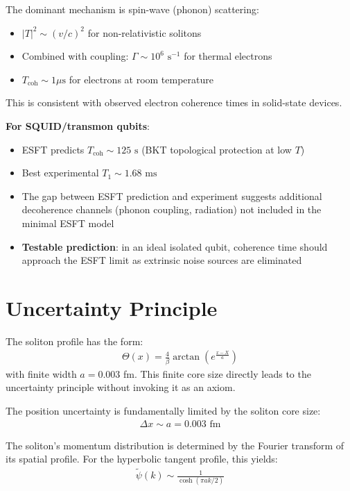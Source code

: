 ﻿\documentclass[twocolumn,showpacs,preprintnumbers,amsmath,amssymb,prd]{revtex4-2}
\begin{document}
The dominant mechanism is spin-wave (phonon) scattering:
\begin{itemize}
\item $|T|^2 \sim (v/c)^2$ for non-relativistic solitons
\item Combined with coupling: $\Gamma \sim 10^6 \text{ s}^{-1}$ for thermal electrons
\item $T_{\text{coh}} \sim 1 \mu\text{s}$ for electrons at room temperature
\end{itemize}

This is consistent with observed electron coherence times in solid-state devices.

\textbf{For SQUID/transmon qubits}:
\begin{itemize}
\item ESFT predicts $T_{\text{coh}} \sim 125 \text{ s}$ (BKT topological protection at low $T$)
\item Best experimental $T_1 \sim 1.68 \text{ ms}$
\item The gap between ESFT prediction and experiment suggests additional decoherence channels (phonon coupling, radiation) not included in the minimal ESFT model
\item \textbf{Testable prediction}: in an ideal isolated qubit, coherence time should approach the ESFT limit as extrinsic noise sources are eliminated
\end{itemize}

\section{Uncertainty Principle}

The soliton profile has the form:
\begin{align}
\Theta(x) = \frac{4}{\beta}\arctan\left(e^{\frac{x-X}{a}}\right)
\end{align}
with finite width $a = 0.003$ fm. This finite core size directly leads to the uncertainty principle without invoking it as an axiom.

The position uncertainty is fundamentally limited by the soliton core size:
\begin{align}
\Delta x \sim a = 0.003 \text{ fm}
\end{align}

The soliton's momentum distribution is determined by the Fourier transform of its spatial profile. For the hyperbolic tangent profile, this yields:
\begin{align}
\tilde{\psi}(k) \sim \frac{1}{\cosh(\pi a k/2)}
\end{align}
\end{document}

